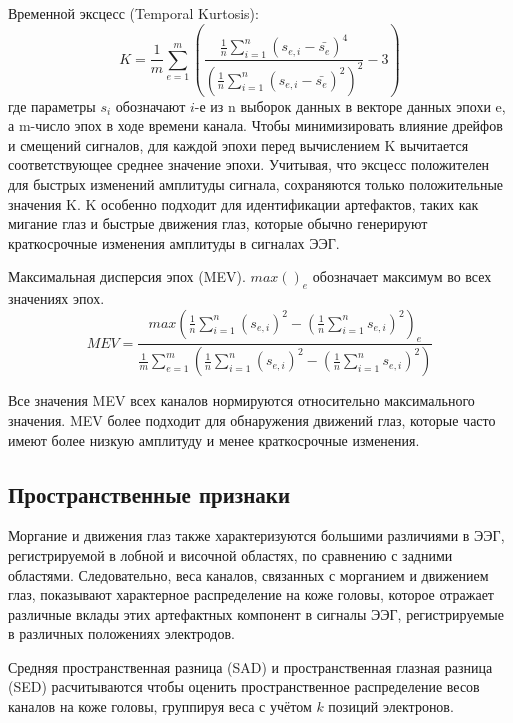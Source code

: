 \documentclass[12pt, a4paper, titlepage]{extreport}
\begin{document}
	Временной эксцесс (Temporal Kurtosis):
	$$
	K = \frac{1}{m}\sum_{e=1}^{m}(\frac{\frac{1}{n}\sum_{i=1}^{n}(s_{e,i} - \bar{s_e})^4}{(\frac{1}{n}\sum_{i=1}^{n}(s_{e,i} - \bar{s_e})^2)^2} - 3) 
	$$
	где параметры $s_i$ обозначают $i$-е из n выборок данных в векторе данных эпохи e, а m-число эпох в ходе времени канала. Чтобы минимизировать влияние дрейфов и смещений сигналов, для каждой эпохи перед вычислением K вычитается соответствующее среднее значение эпохи. Учитывая, что эксцесс положителен для быстрых изменений амплитуды сигнала, сохраняются только положительные значения K. K особенно подходит для идентификации артефактов, таких как мигание глаз и быстрые движения глаз, которые обычно генерируют краткосрочные изменения амплитуды в сигналах ЭЭГ.
	
	Максимальная дисперсия эпох (MEV). $max()_e$ обозначает максимум во всех значениях эпох.
	$$
	MEV = \frac{max(\frac{1}{n}\sum_{i=1}^{n}(s_{e,i})^2 - (\frac{1}{n}\sum_{i=1}^{n}s_{e,i})^2)_e}
	{\frac{1}{m}\sum_{e=1}^{m}(\frac{1}{n}\sum_{i=1}^{n}(s_{e,i})^2 - (\frac{1}{n}\sum_{i=1}^{n}s_{e,i})^2)}
	$$
	
	Все значения MEV всех каналов нормируются относительно максимального значения. MEV более подходит для обнаружения движений глаз, которые часто имеют более низкую амплитуду и менее краткосрочные изменения.
	
	\subsection*{Пространственные признаки}
	Моргание и движения глаз также характеризуются большими различиями в ЭЭГ, регистрируемой в лобной и височной областях, по сравнению с задними областями. Следовательно, веса каналов, связанных с морганием и движением глаз, показывают характерное распределение на коже головы, которое отражает различные вклады этих артефактных компонент в сигналы ЭЭГ, регистрируемые в различных положениях электродов.
	
	Средняя пространственная разница (SAD) и пространственная глазная разница (SED) расчитываются чтобы оценить пространственное распределение весов каналов на коже головы, группируя веса с учётом $k$ позиций электронов.
	
\end{document}

